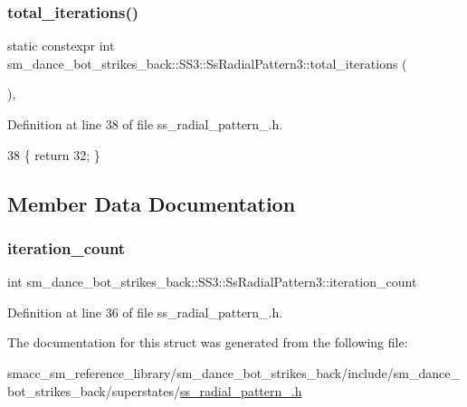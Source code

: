 \subsubsection{\texorpdfstring{total\+\_\+iterations()}{total\_iterations()}}
{\footnotesize\ttfamily static constexpr int sm\+\_\+dance\+\_\+bot\+\_\+strikes\+\_\+back\+::\+S\+S3\+::\+Ss\+Radial\+Pattern3\+::total\+\_\+iterations (\begin{DoxyParamCaption}{ }\end{DoxyParamCaption})\hspace{0.3cm}{\ttfamily [inline]}, {\ttfamily [static]}}



Definition at line 38 of file ss\+\_\+radial\+\_\+pattern\+\_.\+h.


\begin{DoxyCode}
38 \{ \textcolor{keywordflow}{return} 32; \}
\end{DoxyCode}


\subsection{Member Data Documentation}
\mbox{\label{structsm__dance__bot__strikes__back_1_1SS3_1_1SsRadialPattern3_a133c7023088496662119b728f7a6a678}} 
\subsubsection{\texorpdfstring{iteration\+\_\+count}{iteration\_count}}
{\footnotesize\ttfamily int sm\+\_\+dance\+\_\+bot\+\_\+strikes\+\_\+back\+::\+S\+S3\+::\+Ss\+Radial\+Pattern3\+::iteration\+\_\+count}



Definition at line 36 of file ss\+\_\+radial\+\_\+pattern\+\_.\+h.



The documentation for this struct was generated from the following file\+:\begin{DoxyCompactItemize}
\item 
smacc\+\_\+sm\+\_\+reference\+\_\+library/sm\+\_\+dance\+\_\+bot\+\_\+strikes\+\_\+back/include/sm\+\_\+dance\+\_\+bot\+\_\+strikes\+\_\+back/superstates/\hyperlink{sm__dance__bot__strikes__back_2include_2sm__dance__bot__strikes__back_2superstates_2ss__radial__pattern__3_8h}{ss\+\_\+radial\+\_\+pattern\+\_.\+h}\end{DoxyCompactItemize}
